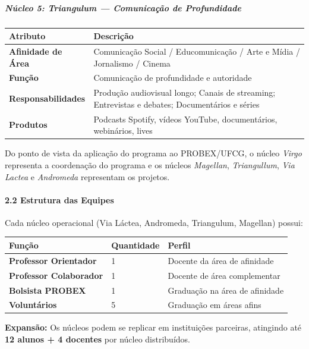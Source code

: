 \bigskip

\subparagraph{Núcleo 5: Triangulum --- Comunicação de Profundidade}

\bigskip\noindent
\begin{tabular}{p{}p{}}
\toprule
Atributo & Descrição \\
\hline
\textbf{Afinidade de Área} & Comunicação Social / Educomunicação / Arte e Mídia / Jornalismo / Cinema \\
\textbf{Função} & Comunicação de profundidade e autoridade \\
\textbf{Responsabilidades} & Produção audiovisual longo; Canais de streaming; Entrevistas e debates; Documentários e séries \\
\textbf{Produtos} & Podcasts Spotify, vídeos YouTube, documentários, webinários, lives \\
\bottomrule
\end{tabular}

\bigskip

Do ponto de vista da aplicação do programa ao PROBEX/UFCG, o núcleo \textit{Virgo} representa a coordenação do programa e os núcleos \textit{Magellan}, \textit{Triangullum}, \textit{Via Lactea} e \textit{Andromeda} representam os projetos.

\paragraph{2.2 Estrutura das Equipes}

Cada núcleo operacional (Via Láctea, Andromeda, Triangulum, Magellan) possui:

\bigskip\noindent
\begin{tabular}{p{}p{}p{}}
\toprule
Função & Quantidade & Perfil \\
\hline
\textbf{Professor Orientador} & 1 & Docente da área de afinidade \\
\textbf{Professor Colaborador} & 1 & Docente de área complementar \\
\textbf{Bolsista PROBEX} & 1 & Graduação na área de afinidade \\
\textbf{Voluntários} & 5 & Graduação em áreas afins \\
\bottomrule
\end{tabular}

\bigskip

\textbf{Expansão:} Os núcleos podem se replicar em instituições parceiras, atingindo até \textbf{12 alunos + 4 docentes} por núcleo distribuídos.

